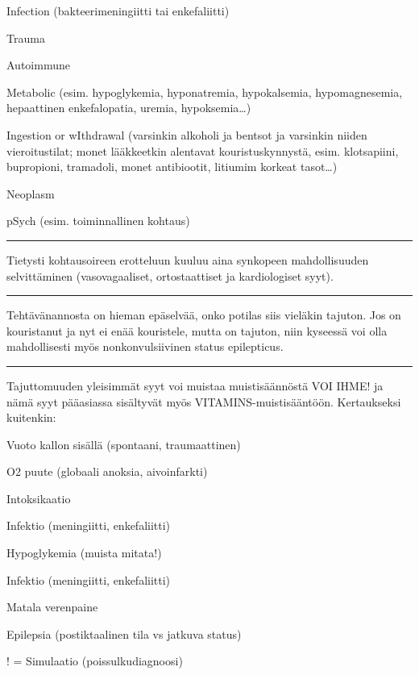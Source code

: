 \documentclass[
]{book}
\begin{document}
Infection (bakteerimeningiitti tai enkefaliitti)

Trauma

Autoimmune

Metabolic (esim. hypoglykemia, hyponatremia, hypokalsemia, hypomagnesemia, hepaattinen enkefalopatia, uremia, hypoksemia\ldots)

Ingestion or wIthdrawal (varsinkin alkoholi ja bentsot ja varsinkin niiden vieroitustilat; monet lääkkeetkin alentavat kouristuskynnystä, esim. klotsapiini, bupropioni, tramadoli, monet antibiootit, litiumim korkeat tasot\ldots)

Neoplasm

pSych (esim. toiminnallinen kohtaus)

\begin{center}\rule{0.5\linewidth}{0.5pt}\end{center}

Tietysti kohtausoireen erotteluun kuuluu aina synkopeen mahdollisuuden selvittäminen (vasovagaaliset, ortostaattiset ja kardiologiset syyt).

\begin{center}\rule{0.5\linewidth}{0.5pt}\end{center}

Tehtävänannosta on hieman epäselvää, onko potilas siis vieläkin tajuton. Jos on kouristanut ja nyt ei enää kouristele, mutta on tajuton, niin kyseessä voi olla mahdollisesti myös nonkonvulsiivinen status epilepticus.

\begin{center}\rule{0.5\linewidth}{0.5pt}\end{center}

Tajuttomuuden yleisimmät syyt voi muistaa muistisäännöstä VOI IHME! ja nämä syyt pääasiassa sisältyvät myös VITAMINS-muistisääntöön. Kertaukseksi kuitenkin:

Vuoto kallon sisällä (spontaani, traumaattinen)

O2 puute (globaali anoksia, aivoinfarkti)

Intoksikaatio

Infektio (meningiitti, enkefaliitti)

Hypoglykemia (muista mitata!)

Infektio (meningiitti, enkefaliitti)

Matala verenpaine

Epilepsia (postiktaalinen tila vs jatkuva status)

! = Simulaatio (poissulkudiagnoosi)
\end{document}
